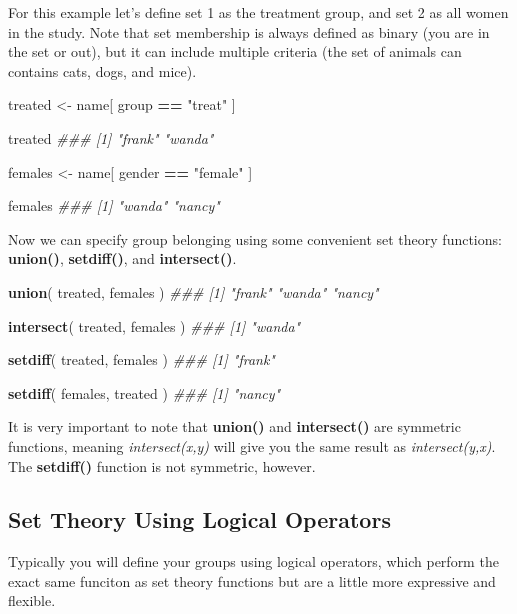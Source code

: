 \documentclass[]{book}
\newenvironment{Shaded}{\begin{snugshade}}{\end{snugshade}}
\newcommand{\CommentTok}[1]{\textcolor[rgb]{0.56,0.35,0.01}{\textit{#1}}}
\newcommand{\KeywordTok}[1]{\textcolor[rgb]{0.13,0.29,0.53}{\textbf{#1}}}
\newcommand{\NormalTok}[1]{#1}
\newcommand{\OperatorTok}[1]{\textcolor[rgb]{0.81,0.36,0.00}{\textbf{#1}}}
\newcommand{\StringTok}[1]{\textcolor[rgb]{0.31,0.60,0.02}{#1}}
\theoremstyle{definition}
\theoremstyle{definition}
\theoremstyle{definition}
\theoremstyle{remark}
\begin{document}
For this example let's define set 1 as the treatment group, and set 2 as
all women in the study. Note that set membership is always defined as
binary (you are in the set or out), but it can include multiple criteria
(the set of animals can contains cats, dogs, and mice).

\begin{Shaded}
\begin{Highlighting}[]
\NormalTok{treated <-}\StringTok{ }\NormalTok{name[ group }\OperatorTok{==}\StringTok{ "treat"}\NormalTok{ ]}

\NormalTok{treated }
\CommentTok{### [1] "frank" "wanda"}

\NormalTok{females <-}\StringTok{ }\NormalTok{name[ gender }\OperatorTok{==}\StringTok{ "female"}\NormalTok{ ]}

\NormalTok{females }
\CommentTok{### [1] "wanda" "nancy"}
\end{Highlighting}
\end{Shaded}

Now we can specify group belonging using some convenient set theory
functions: \textbf{union()}, \textbf{setdiff()}, and
\textbf{intersect()}.

\begin{Shaded}
\begin{Highlighting}[]
\KeywordTok{union}\NormalTok{( treated, females )}
\CommentTok{### [1] "frank" "wanda" "nancy"}

\KeywordTok{intersect}\NormalTok{( treated, females )}
\CommentTok{### [1] "wanda"}

\KeywordTok{setdiff}\NormalTok{( treated, females )}
\CommentTok{### [1] "frank"}

\KeywordTok{setdiff}\NormalTok{( females, treated )}
\CommentTok{### [1] "nancy"}
\end{Highlighting}
\end{Shaded}

It is very important to note that \textbf{union()} and
\textbf{intersect()} are symmetric functions, meaning
\emph{intersect(x,y)} will give you the same result as
\emph{intersect(y,x)}. The \textbf{setdiff()} function is not symmetric,
however.

\hypertarget{set-theory-using-logical-operators}{%
\subsection{Set Theory Using Logical
Operators}\label{set-theory-using-logical-operators}}

Typically you will define your groups using logical operators, which
perform the exact same funciton as set theory functions but are a little
more expressive and flexible.
\end{document}
